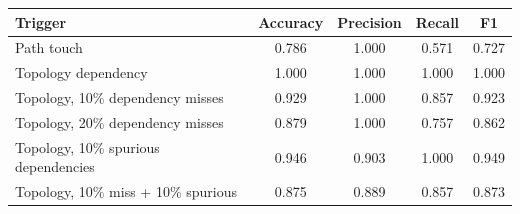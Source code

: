 \begin{tabular}{lcccc}
\toprule
Trigger & Accuracy & Precision & Recall & F1 \\
\midrule
Path touch & 0.786 & 1.000 & 0.571 & 0.727 \\
Topology dependency & 1.000 & 1.000 & 1.000 & 1.000 \\
Topology, 10\% dependency misses & 0.929 & 1.000 & 0.857 & 0.923 \\
Topology, 20\% dependency misses & 0.879 & 1.000 & 0.757 & 0.862 \\
Topology, 10\% spurious dependencies & 0.946 & 0.903 & 1.000 & 0.949 \\
Topology, 10\% miss + 10\% spurious & 0.875 & 0.889 & 0.857 & 0.873 \\
\bottomrule
\end{tabular}
